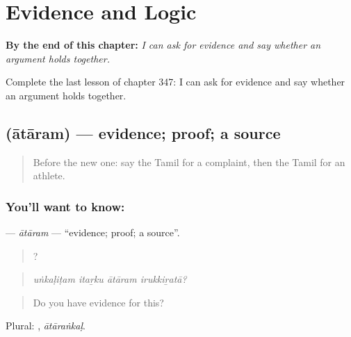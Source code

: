 
\chapter{Evidence and Logic}
\label{ch:ta-evidence-and-logic}

\begin{chapteropening}
\textbf{By the end of this chapter:} \emph{I can ask for evidence and say whether an argument holds together.}

Complete the last lesson of chapter 347: I can ask for evidence and say whether an argument holds together.
\end{chapteropening}

\section[\texorpdfstring{\ta{ஆதாரம்} (ātāram)}{ஆதாரம் (ātāram)}]{ (ātāram) — evidence; proof; a source}

\label{lesson:TA-C347-ataram}



\begin{quote}
Before the new one: say the Tamil for a complaint, then the Tamil for an athlete.
\end{quote}

\subsection*{You'll want to know: }
\textbf{} — \emph{ātāram} — \textquotedblleft{}evidence; proof; a source\textquotedblright{}.

\begin{quote}
   ?
\end{quote}

\begin{quote}
\emph{uṅkaḷiṭam itaṟku ātāram irukkiṟatā?}
\end{quote}

\begin{quote}
Do you have evidence for this?
\end{quote}

Plural: , \emph{ātāraṅkaḷ}.

